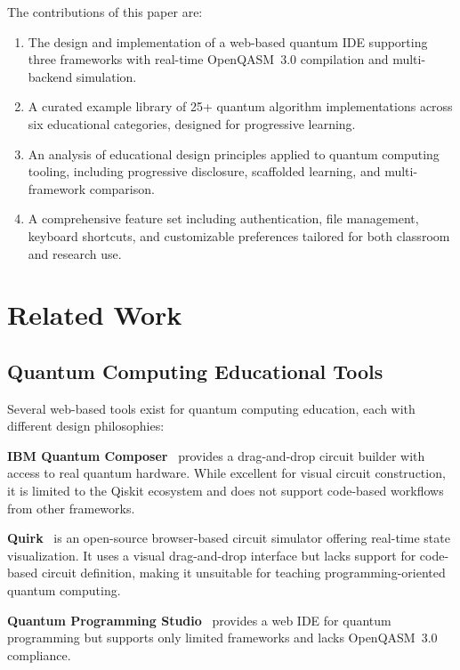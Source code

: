 \documentclass[conference]{IEEEtran}
\begin{document}
The contributions of this paper are:
\begin{enumerate}
    \item The design and implementation of a web-based quantum IDE supporting three frameworks with real-time OpenQASM~3.0 compilation and multi-backend simulation.
    \item A curated example library of 25+ quantum algorithm implementations across six educational categories, designed for progressive learning.
    \item An analysis of educational design principles applied to quantum computing tooling, including progressive disclosure, scaffolded learning, and multi-framework comparison.
    \item A comprehensive feature set including authentication, file management, keyboard shortcuts, and customizable preferences tailored for both classroom and research use.
\end{enumerate}

\section{Related Work}
\label{sec:related}

\subsection{Quantum Computing Educational Tools}

Several web-based tools exist for quantum computing education, each with different design philosophies:

\textbf{IBM Quantum Composer}~\cite{ibmquantum} provides a drag-and-drop circuit builder with access to real quantum hardware. While excellent for visual circuit construction, it is limited to the Qiskit ecosystem and does not support code-based workflows from other frameworks.

\textbf{Quirk}~\cite{quirk2016} is an open-source browser-based circuit simulator offering real-time state visualization. It uses a visual drag-and-drop interface but lacks support for code-based circuit definition, making it unsuitable for teaching programming-oriented quantum computing.

\textbf{Quantum Programming Studio}~\cite{davila2022quantum} provides a web IDE for quantum programming but supports only limited frameworks and lacks OpenQASM~3.0 compliance.
\end{document}

